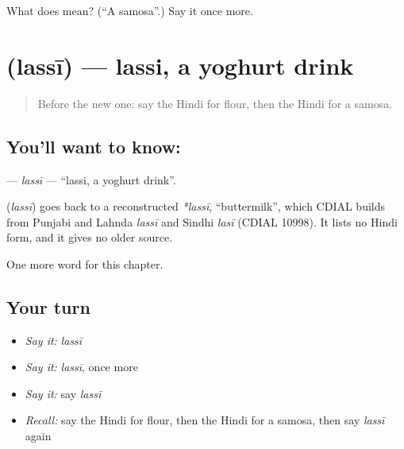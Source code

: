 \begin{tcolorbox}[breakable,colback=teal!4,colframe=teal!35!black,title={Before you move on}]
What does  mean? (\textquotedblleft{}A samosa\textquotedblright{}.) Say it once more.
\end{tcolorbox}
\section[\texorpdfstring{\hi{लस्सी} (lassī)}{लस्सी (lassī)}]{ (lassī) — lassi, a yoghurt drink}

\label{lesson:HI-C142-lassi}



\begin{quote}
Before the new one: say the Hindi for flour, then the Hindi for a samosa.
\end{quote}

\subsection*{You'll want to know: }
\textbf{} — \emph{lassī} — \textquotedblleft{}lassi, a yoghurt drink\textquotedblright{}.

\begin{cousinweb}
\textbf{} (\emph{lassī}) goes back to a reconstructed \emph{*lassī}, \textquotedblleft{}buttermilk\textquotedblright{}, which CDIAL builds from Punjabi and Lahnda \emph{lassī} and Sindhi \emph{lasī} (CDIAL 10998). It lists no Hindi form, and it gives no older source.
\end{cousinweb}

\begin{grammarlens}[title={What you've built}]
One more word for this chapter.
\end{grammarlens}

\subsection*{Your turn}
\begin{itemize}
\raggedright
  \item \emph{Say it:} \emph{lassī}
  \item \emph{Say it:} \emph{lassī}, once more
  \item \emph{Say it:} say \emph{lassī}
  \item \emph{Recall:} say the Hindi for flour, then the Hindi for a samosa, then say \emph{lassī} again
\end{itemize}

